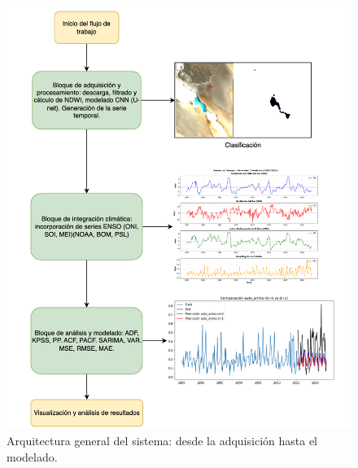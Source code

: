 \newpage


\begin{figure}[htpb] 
    \centering 
    \includegraphics[scale=.4]{Figures/Arqui_TTFB3.png} 
    \caption{Arquitectura general del sistema: desde la adquisición hasta el modelado.} 
    \label{fig:arquitectura_general2} 
\end{figure}

